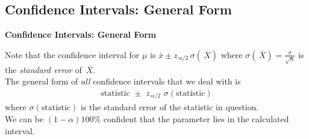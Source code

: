 \documentclass[compress]{beamer}        %
\makeatletter
\newcommand{\tcb}{\textcolor{beamer@blendedblue}}
\makeatother
\begin{document}
\subsection{Confidence Intervals: General Form}
\begin{frame}{\bf \tcb{Confidence Intervals: General Form}}

Note that the confidence interval for $\mu$ is $\bar x \pm z_{\,\alpha/2}\,\sigma(\,\overline{\!X})$ where $\sigma(\,\overline{\!X}) = \frac{\sigma}{\sqrt{n}}$ is the \emph{standard error} of $\,\overline{\!X}$.\\[1cm]

The general form of \emph{all} confidence intervals that we deal with is
\begin{align*}
\boxed{\text{statistic}\,\, \pm \,\,z_{\,\alpha/2}\,\,\sigma(\text{statistic})}
\end{align*}
where $\sigma(\text{statistic})$ is the standard error of the statistic in question.\\[1cm]

We can be $(1-\alpha)100\%$ confident that the parameter lies in the calculated interval.

\end{frame}
\end{document}
